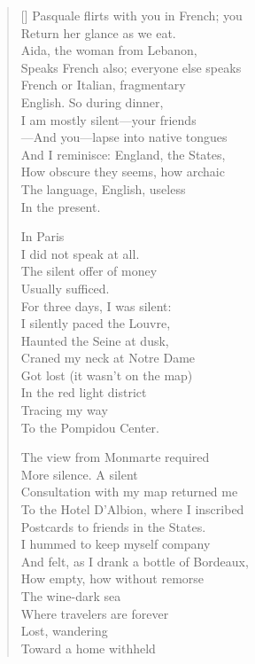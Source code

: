 \label{ch:venezia_mestre}
\settowidth{\versewidth}{As the vaporetto scuds across sequined canals.}
\begin{verse}[\versewidth]
Pasquale flirts with you in French; you\\
Return her glance as we eat.\\
Aida, the woman from Lebanon,\\
Speaks French also; everyone else speaks\\
French or Italian, fragmentary\\
English.  So during dinner,\\
I am mostly silent---your friends\\
---And you---lapse into native tongues\\
And I reminisce: England, the States,\\
How obscure they seems, how archaic\\
The language, English, useless\\
In the present.

                            In Paris\\
I did not speak at all.\\
The silent offer of money\\
Usually sufficed.\\
For three days, I was silent:\\
I silently paced the Louvre,\\
Haunted the Seine at dusk,\\
Craned my neck at Notre Dame\\
Got lost (it wasn't on the map)\\
In the red light district\\
Tracing my way\\
To the Pompidou Center.

The view from Monmarte required\\
More silence.   A silent\\
Consultation with my map returned me\\
To the Hotel D'Albion, where I inscribed\\
Postcards to friends in the States.\\
I hummed to keep myself company\\
And felt, as I drank a bottle of Bordeaux,\\
How empty, how without remorse\\
The wine-dark sea\\
Where travelers are forever\\
Lost, wandering\\
Toward a home withheld


\end{verse}
